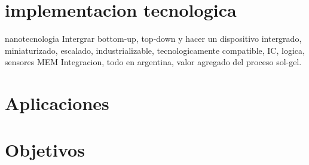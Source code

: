 \section{implementacion tecnologica}
nanotecnologia\cite{Gimenez2017}
Intergrar bottom-up, top-down y hacer un dispositivo intergrado, miniaturizado, escalado, industrializable, tecnologicamente compatible, IC, logica, sensores MEM
Integracion, todo en argentina, valor agregado del proceso sol-gel.\cite{Volksen2010}

\section{Aplicaciones}

\section{Objetivos}
